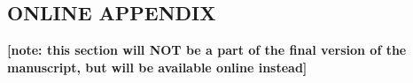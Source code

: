 \documentclass[10pt, letterpaper]{article}
\begin{document}
\begin{spacing}{1.4}








 \section*{\Huge ONLINE APPENDIX}
 \textbf{[note: this section will NOT be a part of the final version of
   the manuscript, but will be available online instead]} %





\end{spacing}
\end{document}
